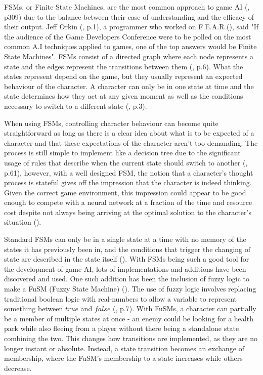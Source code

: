 \documentclass[10pt]{article}
\begin{document}
FSMs, or Finite State Machines, are the most common approach to game AI (\cite{millington2019ai}, p309) due to the balance between their ease of understanding and the efficacy of their output. Jeff Orkin (\citeyear{orkin2006three}, p.1), a programmer who worked on F.E.A.R (\cite{FEAR}), said "If the audience of the Game Developers Conference were to be polled on the most common A.I techniques applied to games, one of the top answers would be Finite State Machines". FSMs consist of a directed graph where each node represents a state and the edges represent the transitions between them (\cite{tozour2002evolution}, p.6). What the states represent depend on the game, but they usually represent an expected behaviour of the character. A character can only be in one state at time and the state determines how they act at any given moment as well as the conditions necessary to switch to a different state (\cite{diller2004behavior}, p.3).

When using FSMs, controlling character behaviour can become quite straightforward as long as there is a clear idea about what is to be expected of a character and that these expectations of the character aren't too demanding. The process is still simple to implement like a decision tree due to the significant usage of rules that describe when the current state should switch to another (\cite{nareyek2004ai}, p.61), however, with a well designed FSM, the notion that a character's thought process is stateful gives off the impression that the character is indeed thinking. Given the correct game environment, this impression could appear to be good enough to compete with a neural network at a fraction of the time and resource cost despite not always being arriving at the optimal solution to the character's situation (\cite{sweetser2002current}).

Standard FSMs can only be in a single state at a time with no memory of the states it has previously been in, and the conditions that trigger the changing of state are described in the state itself (\cite{colledanchise2014performance}). With FSMs being such a good tool for the development of game AI, lots of implementations and additions have been discovered and used. One such addition has been the inclusion of fuzzy logic to make a FuSM (Fuzzy State Machine) (\cite{sweetser2002current}). The use of fuzzy logic involves replacing traditional boolean logic with real-numbers to allow a variable to represent something between $true$ and $false$ (\cite{tozour2002evolution}, p.7). With FuSMs, a character can partially be a member of multiple states at once - an enemy could be looking for a health pack while also fleeing from a player without there being a standalone state combining the two. This changes how transitions are implemented, as they are no longer instant or absolute. Instead, a state transition becomes an exchange of membership, where the FuSM's membership to a state increases while others decrease.
\end{document}
